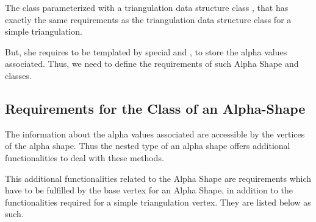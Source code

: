 The class  parameterized with a
triangulation data structure class , that has exactly the same
requirements as the triangulation data structure class for a simple
triangulation.  

But, she requires to be templated by special  and
, to store the alpha values associated. Thus, we need to
define the requirements of such Alpha Shape  and
 classes.

\subsection{Requirements for the \protect {} Class of an
Alpha-Shape\label{I1_SectVertex}} 

The information about the alpha values associated  are accessible by the 
vertices of the alpha shape. Thus the nested 
type of an alpha shape offers additional functionalities to deal with these
methods. 

This additional functionalities related to the Alpha Shape
are requirements which have to be fulfilled
by the base vertex for an Alpha Shape,
in addition to the functionalities required for a simple triangulation vertex.
They are listed below as such.

\ccInheritsFrom


